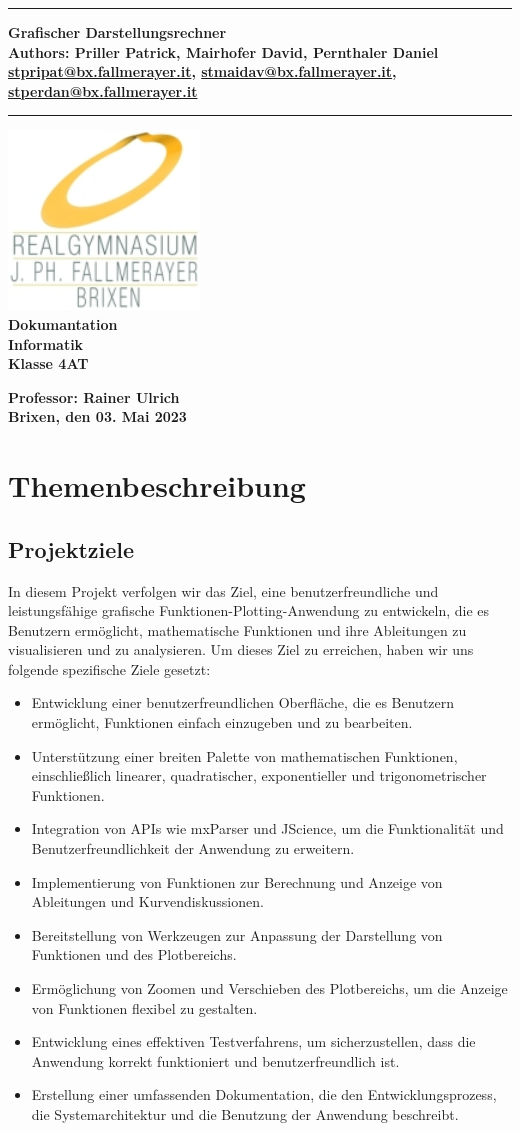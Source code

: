 \documentclass[a4paper]{article}
\newcommand{\CustomTitle}[9]{
    \thispagestyle{empty}
    \vspace*{\stretch{1}}
    {\parindent0cm \rule{\linewidth}{.7ex}}
    \begin{flushright}
        \vspace*{\stretch{1}}
        \sffamily\bfseries\huge
        #1\\
        \vspace*{\stretch{1}}
        \sffamily\bfseries\small
        #2\\
        \vspace*{\stretch{1}}
        \sffamily\bfseries\small
        #3
    \end{flushright}
    \rule{\linewidth}{.7ex}

    \vspace*{\stretch{1}}
    \begin{center}
        \includegraphics[width=2in]{Resources/Logo.png} \\
        \vspace*{\stretch{1}}
        \textbf{\Large Dokumantation}\\

        \vspace*{\stretch{2}}
        \textbf{\large Informatik}\\
        \textbf{\large Klasse 4AT}

        \vspace*{\stretch{1}}
        \textbf{\large Professor: Rainer Ulrich}  \\[1mm]

        \vspace*{\stretch{1}}
        \textbf{\large Brixen, den 03. Mai 2023}\\
        \vspace*{\stretch{0.25}}
    \end{center}
}
\begin{document}
\CustomTitle
{Grafischer Darstellungsrechner}
{Authors: Priller Patrick, Mairhofer David, Pernthaler Daniel}
{\href{mailto:stpripat@bx.fallmerayer.it}{stpripat@bx.fallmerayer.it}, \href{mailto:stmaidav@bx.fallmerayer.it}{stmaidav@bx.fallmerayer.it}, \href{mailto:stperdan@bx.fallmayer.it}{stperdan@bx.fallmerayer.it}}

{Oberschulzentrum J. Ph. Fallmerayer}
{Brixen}
{\today}
{Rainer Ulrich}
{}

\clearpage

\lhead{}
\setcounter{page}{1}
\tableofcontents

\clearpage

\section{Themenbeschreibung}

\subsection{Projektziele}

In diesem Projekt verfolgen wir das Ziel, eine benutzerfreundliche und leistungsfähige grafische Funktionen-Plotting-Anwendung zu entwickeln, die es Benutzern ermöglicht, mathematische Funktionen und ihre Ableitungen zu visualisieren und zu analysieren. Um dieses Ziel zu erreichen, haben wir uns folgende spezifische Ziele gesetzt:

\begin{itemize}
\item Entwicklung einer benutzerfreundlichen Oberfläche, die es Benutzern ermöglicht, Funktionen einfach einzugeben und zu bearbeiten.
\item Unterstützung einer breiten Palette von mathematischen Funktionen, einschließlich linearer, quadratischer, exponentieller und trigonometrischer Funktionen.
\item Integration von APIs wie mxParser und JScience, um die Funktionalität und Benutzerfreundlichkeit der Anwendung zu erweitern.
\item Implementierung von Funktionen zur Berechnung und Anzeige von Ableitungen und Kurvendiskussionen.
\item Bereitstellung von Werkzeugen zur Anpassung der Darstellung von Funktionen und des Plotbereichs.
\item Ermöglichung von Zoomen und Verschieben des Plotbereichs, um die Anzeige von Funktionen flexibel zu gestalten.
\item Entwicklung eines effektiven Testverfahrens, um sicherzustellen, dass die Anwendung korrekt funktioniert und benutzerfreundlich ist.
\item Erstellung einer umfassenden Dokumentation, die den Entwicklungsprozess, die Systemarchitektur und die Benutzung der Anwendung beschreibt.
\end{itemize}
\end{document}
